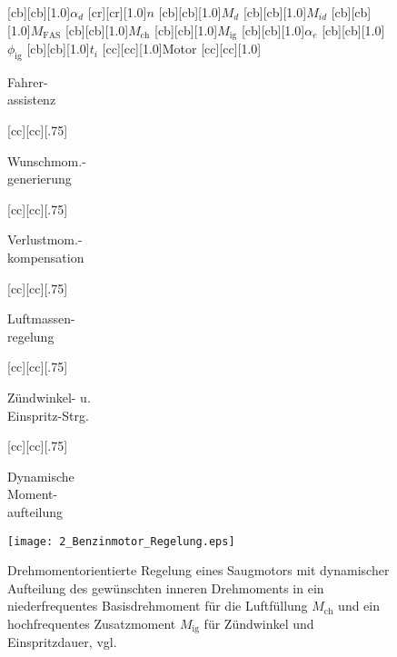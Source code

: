 \begin{figure}[h]
\newcommand{\smallsize}{.75}
	[cb][cb][1.0]{$\alpha_d$}
	[cr][cr][1.0]{$n$}
	[cb][cb][1.0]{$M_d$}
	[cb][cb][1.0]{$M_{id}$}
	[cb][cb][1.0]{$M_\text{FAS}$}
	[cb][cb][1.0]{$M_\text{ch}$}
	[cb][cb][1.0]{$M_\text{ig}$}
	[cb][cb][1.0]{$\alpha_e$}
	[cb][cb][1.0]{$\phi_\text{ig}$}
	[cb][cb][1.0]{$t_i$}
	[cc][cc][1.0]{Motor}
	[cc][cc][1.0]{{\parbox[c]{7cm}{\begin{center} Fahrer- \\ assistenz \end{center}}}}
	[cc][cc][\smallsize]{{\parbox[c]{7cm}{\begin{center} Wunschmom.- \\ generierung \end{center}}}}
	[cc][cc][\smallsize]{{\parbox[c]{7cm}{\begin{center} Verlustmom.- \\ kompensation \end{center}}}}
	[cc][cc][\smallsize]{{\parbox[c]{7cm}{\begin{center} Luftmassen- \\ regelung \end{center}}}}
	[cc][cc][\smallsize]{{\parbox[c]{7cm}{\begin{center} Zündwinkel- u.\ \\ Einspritz-Strg.\ \end{center}}}}
	[cc][cc][\smallsize]{{\parbox[c]{7cm}{\begin{center} Dynamische \\ Moment- \\ aufteilung \end{center}}}}
\centering
\texttt{[image: 2\_Benzinmotor\_Regelung.eps]}
 \caption[Drehmomentorientierte Regelung eines Saugmotors]{Drehmomentorientierte Regelung eines Saugmotors mit dynamischer Aufteilung des gewünschten inneren Drehmoments in ein niederfrequentes Basisdrehmoment für die Luftfüllung $M_\text{ch}$ und ein hochfrequentes Zusatzmoment $M_\text{ig}$ für Zündwinkel und Einspritzdauer, vgl.\ \cite{isermann2010mechatronische}} %
 \label{fig:motor_funktionsweise}
\end{figure} 

